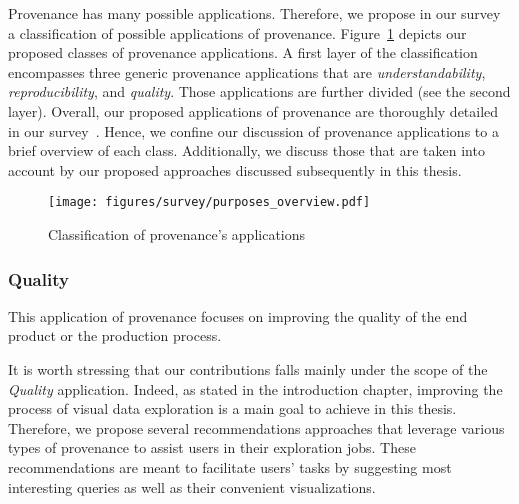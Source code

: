 Provenance has many possible applications. Therefore, we propose in our survey~\cite{Herschel2017survey} a classification of possible applications of provenance. 
Figure~\ref{fig:purposes} depicts our proposed classes of provenance applications.
A first layer of the classification encompasses three generic provenance applications that are \emph{understandability}, \emph{reproducibility}, and \emph{quality}. 
Those applications are further divided (see the second layer).
Overall, our proposed applications of provenance are thoroughly detailed in our survey~\cite{Herschel2017survey}. Hence, we confine our discussion of provenance applications to a brief overview of each class. Additionally, we discuss those that are taken into account by our proposed approaches discussed subsequently in this thesis.


 \begin{figure}[t]
\centering
\texttt{[image: figures/survey/purposes\_overview.pdf]}
\caption{Classification of provenance's applications~\cite{Herschel2017survey}}
\label{fig:purposes}
\end{figure}



 \subsubsection{Quality}
This application of provenance focuses on improving the quality of the end product or the production process. 


  
{\color{Fuchsia}It is worth stressing that our contributions falls mainly under the scope of the \emph{Quality} application.
Indeed, as stated in the introduction chapter, improving the process of visual data exploration is a main goal to achieve in this thesis. Therefore, we propose several recommendations approaches that leverage various types of provenance to assist users in their exploration jobs.
These recommendations are meant to facilitate users' tasks by suggesting most interesting queries as well as their convenient visualizations.}







